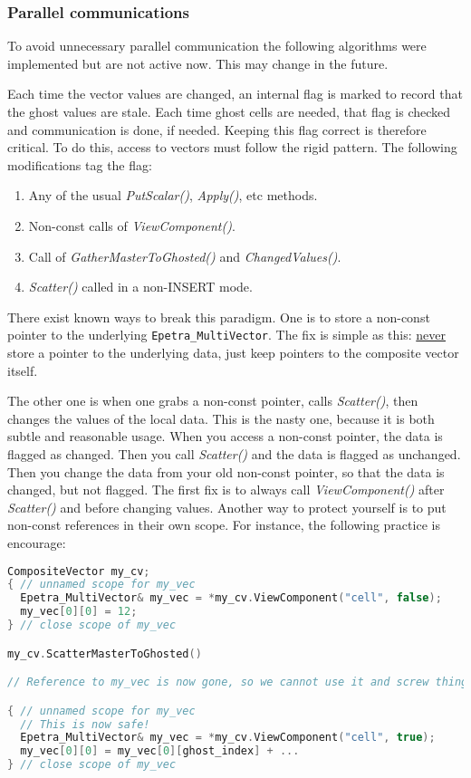 \subsubsection{Parallel communications}
To avoid unnecessary parallel communication the following algorithms were implemented
but are not active now.
This may change in the future.

Each time the vector values are changed, an internal flag is marked to
record that the ghost values are stale.
Each time ghost cells are needed, that flag is checked and communication
is done, if needed.
Keeping this flag correct is therefore critical. 
To do this, access to vectors must follow the rigid pattern.
The following modifications tag the flag:

\begin{enumerate}
\item Any of the usual {\it PutScalar()}, {\it Apply()}, etc methods.
\item Non-const calls of {\it ViewComponent()}.
\item Call of {\it GatherMasterToGhosted()} and {\it ChangedValues()}.
\item {\it Scatter()} called in a non-{\rm INSERT} mode.
\end{enumerate}

There exist known ways to break this paradigm. 
One is to store a non-const pointer to the underlying {\tt Epetra\_MultiVector}.
The fix is simple as this: \underline{never} store a pointer to the underlying data, 
just keep pointers to the composite vector itself.

The other one is when one grabs a non-const pointer, calls {\it Scatter()}, then 
changes the values of the local data.  
This is the nasty one, because it is both subtle and reasonable usage.
When you access a non-const pointer, the data is flagged as changed.
Then you call {\it Scatter()} and the data is flagged as unchanged.
Then you change the data from your old non-const pointer, so that the data is changed, but not flagged.
The first fix is to always call {\it ViewComponent()} after {\it Scatter()} and before changing values.
Another way to protect yourself is to put non-const references in their own scope.
For instance, the following practice is encourage:
\begin{lstlisting}[language=C++]
CompositeVector my_cv;
{ // unnamed scope for my_vec
  Epetra_MultiVector& my_vec = *my_cv.ViewComponent("cell", false);
  my_vec[0][0] = 12;
} // close scope of my_vec

my_cv.ScatterMasterToGhosted()

// Reference to my_vec is now gone, so we cannot use it and screw things up!

{ // unnamed scope for my_vec
  // This is now safe!
  Epetra_MultiVector& my_vec = *my_cv.ViewComponent("cell", true);
  my_vec[0][0] = my_vec[0][ghost_index] + ...
} // close scope of my_vec
\end{lstlisting}

